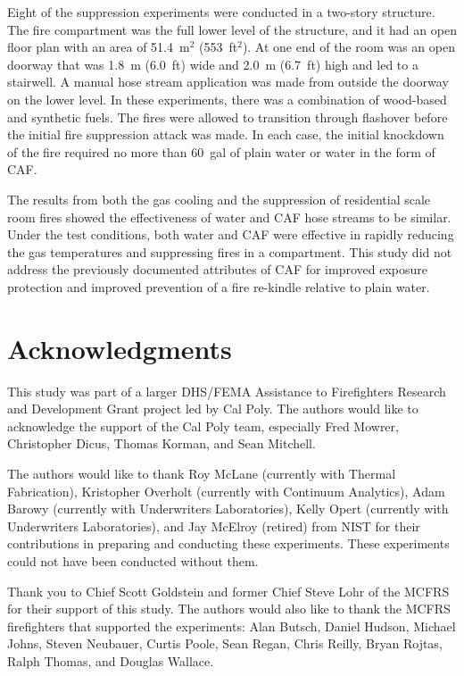 \documentclass[12pt,oneside]{book}
\begin{document}
Eight of the suppression experiments were conducted in a two-story structure.  The fire compartment was the full lower level of the structure, and it had an open floor plan with an area of 51.4~m$^2$ (553~ft$^2$). At one end of the room was an open doorway that was 1.8~m (6.0~ft) wide and 2.0~m (6.7~ft) high and led to a stairwell. A manual hose stream application was made from outside the doorway on the lower level. In these experiments, there was a combination of wood-based and synthetic fuels. The fires were allowed to transition through flashover before the initial fire suppression attack was made. In each case, the initial knockdown of the fire required no more than 60~gal of plain water or water in the form of CAF.   

The results from both the gas cooling and the suppression of residential scale room fires showed the effectiveness of water and CAF hose streams to be similar. Under the test conditions, both water and CAF were effective in rapidly reducing the gas temperatures and suppressing fires in a compartment.  This study did not address the previously documented attributes of CAF for improved exposure protection and improved prevention of a fire re-kindle relative to plain water. 


\chapter{Acknowledgments}
\label{chap:acknowledgments}

This study was part of a larger DHS/FEMA Assistance to Firefighters Research and Development Grant project led by Cal Poly. The authors would like to acknowledge the support of the Cal Poly team, especially Fred Mowrer, Christopher Dicus, Thomas Korman, and Sean Mitchell.

The authors would like to thank Roy McLane (currently with Thermal Fabrication), Kristopher Overholt (currently with Continuum Analytics), Adam Barowy (currently with Underwriters Laboratories), Kelly Opert (currently with Underwriters Laboratories), and Jay McElroy (retired) from NIST for their contributions in preparing and conducting these experiments. These experiments could not have been conducted without them. 

Thank you to Chief Scott Goldstein and former Chief Steve Lohr of the MCFRS for their support of this study. The authors would also like to thank the MCFRS firefighters that supported the experiments: Alan Butsch, Daniel Hudson, Michael Johns, Steven Neubauer, Curtis Poole, Sean Regan, Chris Reilly, Bryan Rojtas, Ralph Thomas, and Douglas Wallace. 
\end{document}
